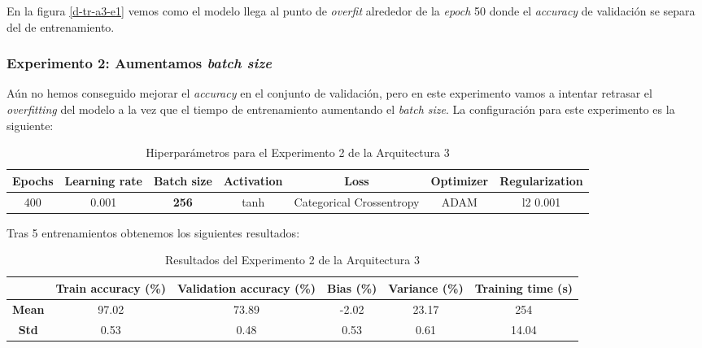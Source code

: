 \documentclass{article}
\begin{document}
			En la figura \ref{d-tr-a3-e1} vemos como el modelo llega al punto de \textit{overfit} alrededor de la \textit{epoch} 50 donde el \textit{accuracy} de validaci\'on se separa del de entrenamiento.
			
		\subsubsection{Experimento 2: Aumentamos \textit{batch size}}
		\label{d-s-a3-e2}
			A\'un no hemos conseguido mejorar el \textit{accuracy} en el conjunto de validaci\'on, pero en este experimento vamos a intentar retrasar el \textit{overfitting} del modelo a la vez que el tiempo de entrenamiento aumentando el \textit{batch size}. La configuraci\'on para este experimento es la siguiente:
			\begin{table}[!h]
				\begin{tabular}{| c | c | c | c | c | c | c |}
					\textbf{Epochs} & \textbf{Learning rate} & \textbf{Batch size} & \textbf{Activation} & \textbf{Loss} & \textbf{Optimizer} & \textbf{Regularization} \\ \hline
					400 & 0.001 & \textbf{256} & tanh & Categorical Crossentropy & ADAM & l2 0.001
				\end{tabular}
				\caption{Hiperpar\'ametros para el Experimento 2 de la Arquitectura 3}
				\label{tab:hip-d-a3-e2}
			\end{table}
				
			Tras 5 entrenamientos obtenemos los siguientes resultados:
			\begin{table}[!h]
				\begin{center}
					\begin{tabular}{ c | c | c | c | c | c |}
						\ & \textbf{Train accuracy (\%)} & \textbf{Validation accuracy (\%)} & \textbf{Bias (\%)} & \textbf{Variance (\%)} & \textbf{Training time (s)} \\ \hline
						\textbf{Mean} & 97.02 & 73.89 & -2.02 & 23.17 & 254 \\ \hline
						\textbf{Std} & 0.53 & 0.48 & 0.53 & 0.61 & 14.04 \\ \hline
					\end{tabular}
					\caption{Resultados del Experimento 2 de la Arquitectura 3}
					\label{tab:res-d-a3-e2}
				\end{center}
			\end{table}
				
\end{document}
